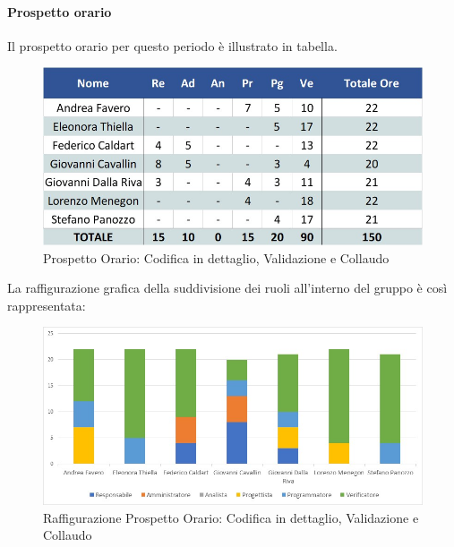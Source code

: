 \paragraph{Prospetto orario}
Il prospetto orario per questo periodo è illustrato in tabella.
\begin{figure}[H]
	\centerline{\includegraphics[scale=0.7]{img/Preventivo/CodDettaglioValidazioneCollaudoOrario.jpg}}
	\caption{Prospetto Orario: Codifica in dettaglio, Validazione e Collaudo}
	\clearpage
\end{figure}
La raffigurazione grafica della suddivisione dei ruoli all'interno del gruppo è così rappresentata: 
\begin{figure}[H]
	\centerline{\includegraphics[scale=0.85]{img/Preventivo/Istogrammi/CodDettaglioValidazioneCollaudo.jpg}}
	\caption{Raffigurazione Prospetto Orario: Codifica in dettaglio, Validazione e Collaudo}
	\clearpage
\end{figure}
\newpage
